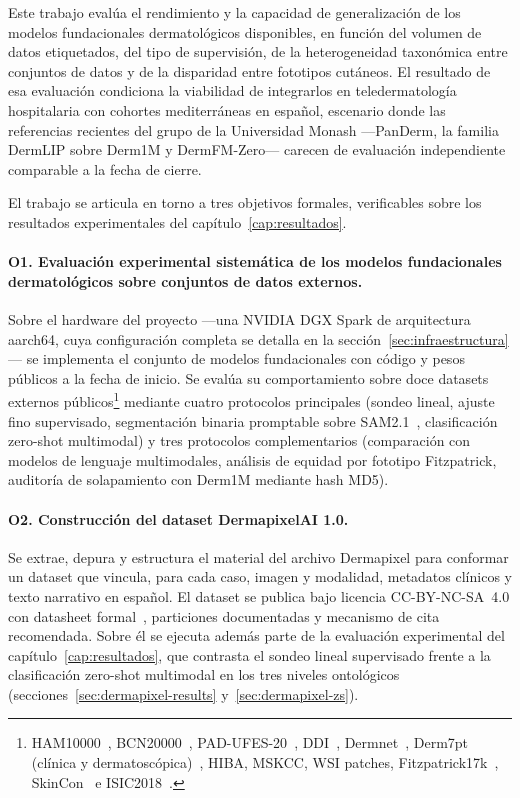 Este trabajo evalúa el rendimiento y la capacidad de generalización
de los modelos fundacionales dermatológicos disponibles, en función
del volumen de datos etiquetados, del tipo de supervisión, de la
heterogeneidad taxonómica entre conjuntos de datos y de la disparidad
entre fototipos cutáneos. El resultado de esa evaluación condiciona la
viabilidad de integrarlos en teledermatología hospitalaria con cohortes
mediterráneas en español, escenario donde las referencias recientes del
grupo de la Universidad Monash ---PanDerm, la familia DermLIP sobre
Derm1M y DermFM-Zero--- carecen de evaluación independiente comparable
a la fecha de cierre.

El trabajo se articula en torno a tres objetivos formales,
verificables sobre los resultados experimentales del
capítulo~\ref{cap:resultados}.

\paragraph{O1. Evaluación experimental sistemática de los modelos
fundacionales dermatológicos sobre conjuntos de datos externos.}
Sobre el hardware del proyecto ---una NVIDIA DGX Spark de
arquitectura aarch64, cuya configuración completa se detalla en la
sección~\ref{sec:infraestructura}--- se implementa el conjunto de
modelos fundacionales con código y pesos públicos a la fecha de
inicio. Se evalúa su
comportamiento sobre doce datasets externos
públicos\footnote{HAM10000~\cite{ham10000},
BCN20000~\cite{bcn20000}, PAD-UFES-20~\cite{padufes},
DDI~\cite{ddi}, Dermnet~\cite{dermnet}, Derm7pt
(clínica y dermatoscópica)~\cite{kawahara2019}, HIBA, MSKCC, WSI
patches, Fitzpatrick17k~\cite{fitzpatrick17k},
SkinCon~\cite{skincon} e ISIC2018~\cite{isic2018}.} mediante cuatro
protocolos principales (sondeo lineal, ajuste fino supervisado,
segmentación binaria promptable sobre SAM2.1~\cite{sam2},
clasificación zero-shot multimodal) y tres protocolos
complementarios (comparación con modelos de lenguaje multimodales,
análisis de equidad por fototipo Fitzpatrick, auditoría de
solapamiento con Derm1M mediante hash MD5).

\paragraph{O2. Construcción del dataset DermapixelAI 1.0.}
Se extrae, depura y estructura el material del archivo Dermapixel
para conformar un dataset que vincula, para cada caso, imagen y
modalidad, metadatos clínicos y texto narrativo en español. El
dataset se publica bajo licencia CC-BY-NC-SA~4.0 con datasheet
formal~\cite{datasheets2018}, particiones documentadas y mecanismo
de cita recomendada. Sobre él se ejecuta además parte de la
evaluación experimental del capítulo~\ref{cap:resultados}, que
contrasta el sondeo lineal supervisado frente a la clasificación
zero-shot multimodal en los tres niveles ontológicos
(secciones~\ref{sec:dermapixel-results} y~\ref{sec:dermapixel-zs}).


